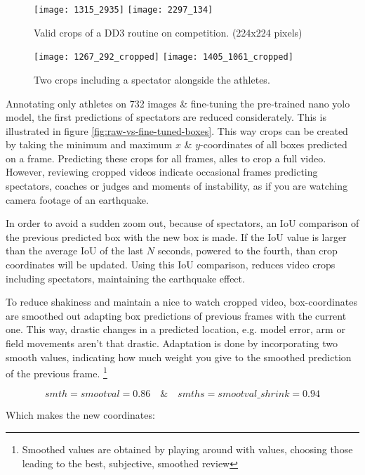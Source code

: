 \begin{figure}
    \centering
    \texttt{[image: 1315\_2935]}
    \texttt{[image: 2297\_134]}
    \caption[Valid crops of a DD3 routine on competition.]{Valid crops of a DD3 routine on competition. (224x224 pixels)}
    \label{fig:dd3-crop}
\end{figure}

\begin{figure}
    \centering
    \texttt{[image: 1267\_292\_cropped]}
    \texttt{[image: 1405\_1061\_cropped]}
    \caption[dd3-crop-error]{Two crops including a spectator alongside the athletes.}
    \label{fig:dd3-crop-error}
\end{figure}

Annotating only athletes on 732 images \& fine-tuning the pre-trained nano yolo model, the first predictions of spectators are reduced considerately. This is illustrated in figure \ref{fig:raw-vs-fine-tuned-boxes}.
This way crops can be created by taking the minimum and maximum \(x\) \& \(y\)-coordinates of all boxes predicted on a frame. Predicting these crops for all frames, alles to crop a full video.
However, reviewing cropped videos indicate occasional frames predicting spectators, coaches or judges and moments of instability, as if you are watching camera footage of an earthquake.

In order to avoid a sudden zoom out, because of spectators, an IoU comparison of the previous predicted box with the new box is made. If the IoU value is larger than the average IoU of the last \(N\) seconds, powered to the fourth, than crop coordinates will be updated. Using this IoU comparison, reduces video crops including spectators, maintaining the earthquake effect.


To reduce shakiness and maintain a nice to watch cropped video, box-coordinates are smoothed out adapting box predictions of previous frames with the current one. This way, drastic changes in a predicted location, e.g. model error, arm or field movements aren't that drastic. Adaptation is done by incorporating two smooth values, indicating how much weight you give to the smoothed prediction of the previous frame. \footnote{Smoothed values are obtained by playing around with values, choosing those leading to the best, subjective, smoothed review}

$$ smth = smootval = 0.86  \quad \& \quad smths = smootval\_shrink = 0.94 $$

Which makes the new coordinates:

